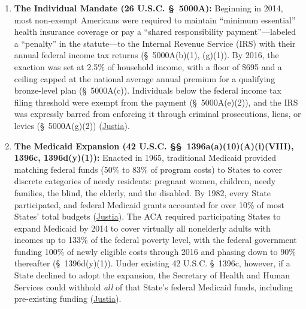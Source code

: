 \documentclass[12pt]{article}
\begin{document}
\begin{enumerate}
\item \textbf{The Individual Mandate (26 U.S.C. \S~5000A):} Beginning in 2014, most non-exempt Americans were required to maintain ``minimum essential'' health insurance coverage or pay a ``shared responsibility payment''---labeled a ``penalty'' in the statute---to the Internal Revenue Service (IRS) with their annual federal income tax returns (\S~5000A(b)(1), (g)(1)). By 2016, the exaction was set at 2.5\% of household income, with a floor of \$695 and a ceiling capped at the national average annual premium for a qualifying bronze-level plan (\S~5000A(c)). Individuals below the federal income tax filing threshold were exempt from the payment (\S~5000A(e)(2)), and the IRS was expressly barred from enforcing it through criminal prosecutions, liens, or levies (\S~5000A(g)(2)) (\href{https://supreme.justia.com/cases/federal/us/567/519/}{Justia}).

\item \textbf{The Medicaid Expansion (42 U.S.C. \S\S~1396a(a)(10)(A)(i)(VIII), 1396c, 1396d(y)(1)):} Enacted in 1965, traditional Medicaid provided matching federal funds (50\% to 83\% of program costs) to States to cover discrete categories of needy residents: pregnant women, children, needy families, the blind, the elderly, and the disabled. By 1982, every State participated, and federal Medicaid grants accounted for over 10\% of most States' total budgets (\href{https://supreme.justia.com/cases/federal/us/567/519/}{Justia}). The ACA required participating States to expand Medicaid by 2014 to cover virtually all nonelderly adults with incomes up to 133\% of the federal poverty level, with the federal government funding 100\% of newly eligible costs through 2016 and phasing down to 90\% thereafter (\S~1396d(y)(1)). Under existing 42 U.S.C. \S~1396c, however, if a State declined to adopt the expansion, the Secretary of Health and Human Services could withhold \textit{all} of that State's federal Medicaid funds, including pre-existing funding (\href{https://supreme.justia.com/cases/federal/us/567/519/}{Justia}).
\end{enumerate}
\end{document}
